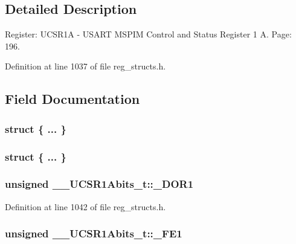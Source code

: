\subsection{Detailed Description}
Register\+: U\+C\+S\+R1\+A -\/ U\+S\+A\+R\+T M\+S\+P\+I\+M Control and Status Register 1 A. Page\+: 196. 

Definition at line 1037 of file reg\+\_\+structs.\+h.



\subsection{Field Documentation}
\hypertarget{union_____u_c_s_r1_abits__t_a41b243ea973f05e2d06fd4775747994b}{\subsubsection[{"@251}]{\setlength{\rightskip}{0pt plus 5cm}struct \{ ... \} }}\label{union_____u_c_s_r1_abits__t_a41b243ea973f05e2d06fd4775747994b}
\hypertarget{union_____u_c_s_r1_abits__t_a7df4f9d2e2b9a9edf4a0917c8a73b2b1}{\subsubsection[{"@253}]{\setlength{\rightskip}{0pt plus 5cm}struct \{ ... \} }}\label{union_____u_c_s_r1_abits__t_a7df4f9d2e2b9a9edf4a0917c8a73b2b1}
\hypertarget{union_____u_c_s_r1_abits__t_aee4899f794cda804485f4631d12bd220}{
\subsubsection[{\+\_\+\+D\+O\+R1}]{\setlength{\rightskip}{0pt plus 5cm}unsigned \+\_\+\+\_\+\+U\+C\+S\+R1\+Abits\+\_\+t\+::\+\_\+\+D\+O\+R1}}\label{union_____u_c_s_r1_abits__t_aee4899f794cda804485f4631d12bd220}


Definition at line 1042 of file reg\+\_\+structs.\+h.

\hypertarget{union_____u_c_s_r1_abits__t_adc9cf635c2542d92e91c6647bea05c4c}{
\subsubsection[{\+\_\+\+F\+E1}]{\setlength{\rightskip}{0pt plus 5cm}unsigned \+\_\+\+\_\+\+U\+C\+S\+R1\+Abits\+\_\+t\+::\+\_\+\+F\+E1}}\label{union_____u_c_s_r1_abits__t_adc9cf635c2542d92e91c6647bea05c4c}


